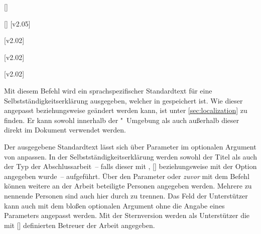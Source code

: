 \begin{DeclareEntity*}{}
\begin{DeclareEntity*}{}
\begin{DeclareEntity*}{}
\begin{Declaration}
  {[]}
\begin{Declaration}
  {[\OList]}
  [v2.05]
\begin{Declaration}
  {}
\begin{Declaration}
  {}
\begin{Declaration}
  {}
\begin{Declaration}
  {}
\begin{Declaration}
  {}
  [v2.02]
\begin{Declaration}
  {}
  [v2.02]
\begin{Declaration}
  {}
  [v2.02]
\begin{Declaration}
  {}
\printdeclarationlist[Datum]

Mit diesem Befehl wird ein sprachspezifischer Standardtext für eine 
Selbstständigkeitserklärung ausgegeben, welcher in  
gespeichert ist. Wie dieser angepasst beziehungsweise geändert werden kann, ist 
unter \autoref{sec:localization} zu finden. Er kann sowohl innerhalb der 
"~Umgebung als auch außerhalb dieser direkt im 
Dokument verwendet werden. 

Der ausgegebene Standardtext lässt sich über Parameter im optionalen Argument 
von  anpassen. In der Selbstständigkeitserklärung werden 
sowohl der Titel als auch der Typ der Abschlussarbeit~-- falls dieser mit 
, [] beziehungsweise 
mit der Option  angegeben wurde~-- aufgeführt. Über den 
Parameter  oder \emph{zuvor} mit dem 
Befehl  können weitere an der Arbeit beteiligte Personen 
angegeben werden. Mehrere zu nennende Personen sind auch hier durch  
zu trennen. Das Feld der Unterstützer kann auch mit dem bloßen optionalen 
Argument ohne die Angabe eines Parameters angepasst werden. 
%
Mit der Sternversion  werden als Unterstützer die mit 
[] definierten Betreuer der Arbeit angegeben.


\end{Declaration}
\end{Declaration}
\end{Declaration}
\end{Declaration}
\end{Declaration}
\end{Declaration}
\end{Declaration}
\end{Declaration}
\end{Declaration}
\end{Declaration}
\end{DeclareEntity*}
\end{DeclareEntity*}
\end{DeclareEntity*}
